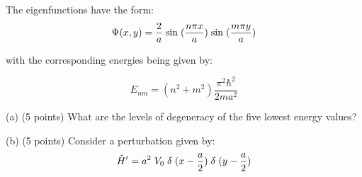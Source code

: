 \documentclass[12pt]{article}
\begin{document}
\vskip0.1in

The eigenfunctions have the form:
\begin{equation*}
	\Psi (x,y) = \frac{2}{a} \hspace*{1mm}
	\mathrm{ sin}\hspace*{1mm}(\frac{n\pi x}{a} ) \hspace*{1mm} \mathrm{sin}\hspace*{1mm} (\frac{m \pi y}{a} )
\end{equation*}

with the corresponding energies being given by: 

\begin{equation*}
	E_{nm} = (n^{2} + m ^{2}) \frac{\pi^{2} \hbar^{2}}{2ma^{2}} 
\end{equation*}
\vskip0.15in

\hspace*{1mm}  (a)  \hspace*{1mm} (5 points) What are the levels of degeneracy of the five lowest energy values?

\vskip0.1in
\hspace*{1mm}  (b) \hspace*{1mm} (5 points) Consider a perturbation given by:
\begin{equation*} 
	\hat{H}'  =a^{2} \hspace*{1mm}  V_{0} \hspace*{1mm}  \delta \hspace*{1mm} (x - \frac{a}{2} ) \hspace*{1mm}  \delta \hspace*{1mm}  (y - \frac{a}{2} ) 
\end{equation*}
\end{document}
